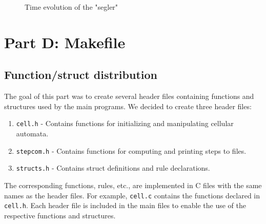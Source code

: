 \documentclass[12pt,a4paper]{article}
\begin{document}
\vspace{0.5cm}

\begin{figure}[H]
    \centering
    \begin{minipage}[b]{0.35\textwidth}
        \centering
        \caption*{\small $t=0$}
    \end{minipage}
    \hspace{0.2cm} %
    \begin{minipage}[b]{0.35\textwidth}
        \centering
        \caption*{\small $t=50$}
    \end{minipage}
    \vspace{0.5cm}
    \begin{minipage}[b]{0.35\textwidth}
        \centering
        \caption*{\small $t=100$}
    \end{minipage}
    \hspace{0.2cm} %
    \begin{minipage}[b]{0.35\textwidth}
        \centering
        \caption*{\small $t=150$}
    \end{minipage}
    \caption{\small Time evolution of the "segler"}
    \label{fig:time_evolution_square}
\end{figure}


\newpage


\section{Part D: Makefile}
\vspace{1cm}


\subsection{Function/struct distribution}
The goal of this part was to create several header files containing functions and structures used by the main programs.
\newline
We decided to create three header files:
\begin{enumerate}[label=\roman*.]
    \item \texttt{cell.h} - Contains functions for initializing and manipulating cellular automata.
    \item \texttt{stepcom.h} - Contains functions for computing and printing steps to files.
    \item \texttt{structs.h} - Contains struct definitions and rule declarations.
\end{enumerate}
The corresponding functions, rules, etc., are implemented in C files with the same names as the header files. 
For example, \texttt{cell.c} contains the functions declared in \texttt{cell.h}. Each header file is included in the main files 
to enable the use of the respective functions and structures.
\end{document}
